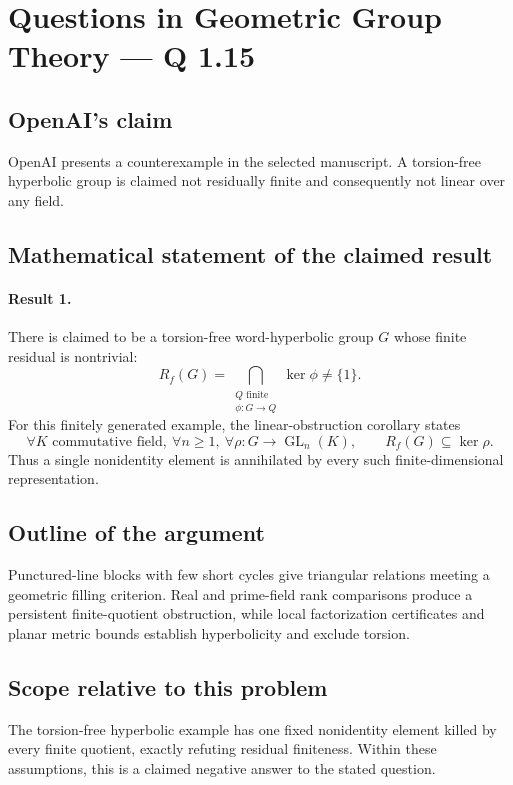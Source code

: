 \documentclass[11pt]{article}
\begin{document}
\section*{Questions in Geometric Group Theory — Q 1.15}

\subsection{OpenAI's claim}
OpenAI presents a counterexample in the selected manuscript. A torsion-free hyperbolic group is claimed not residually finite and consequently not linear over any field.

\subsection{Mathematical statement of the claimed result}
\paragraph{Result 1.} There is claimed to be a torsion-free word-hyperbolic group \(G\) whose finite residual is nontrivial:
\[
 R_f(G)=\bigcap_{\substack{Q\text{ finite}\\\phi:G\to Q}}\ker\phi\ne\{1\}.
\]
For this finitely generated example, the linear-obstruction corollary states
\[
 \forall K\text{ commutative field},\ \forall n\ge1,\ \forall\rho:G\to\operatorname{GL}_n(K),\qquad
 R_f(G)\subseteq\ker\rho.
\]
Thus a single nonidentity element is annihilated by every such finite-dimensional representation.

\subsection{Outline of the argument}
Punctured-line blocks with few short cycles give triangular relations meeting a geometric filling criterion. Real and prime-field rank comparisons produce a persistent finite-quotient obstruction, while local factorization certificates and planar metric bounds establish hyperbolicity and exclude torsion.

\subsection{Scope relative to this problem}
The torsion-free hyperbolic example has one fixed nonidentity element killed by every finite quotient, exactly refuting residual finiteness. Within these assumptions, this is a claimed negative answer to the stated question.
\end{document}
